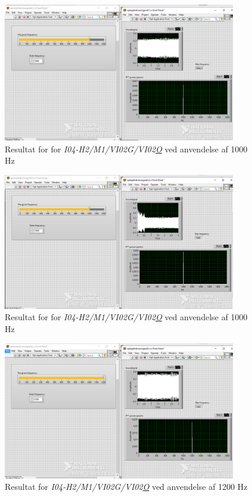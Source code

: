 			\begin{figure}[htb]
			\centering
				\includegraphics[width=4in]{Bordtest41000Hz}
				\caption{Resultat for for \textit{I04-H2/M1/VI02G/VI02\underline{O}} ved anvendelse af 1000 Hz}	
				\label{fig:bt41000}
			\end{figure} 
			
			\begin{figure}[htb]
			\centering
				\includegraphics[width=4in]{Bordtest41000Hzb}
				\caption{Resultat for for \textit{I04-H2/M1/VI02G/VI02\underline{O}} ved anvendelse af 1000 Hz}	
				\label{fig:bt41000b}
			\end{figure} 
			
			\begin{figure}[htb]
			\centering
				\includegraphics[width=4in]{Bordtest41200Hz}
				\caption{Resultat for \textit{I04-H2/M1/VI02G/VI02\underline{O}} ved anvendelse af 1200 Hz}	
				\label{fig:bt41200}
			\end{figure} 
	
